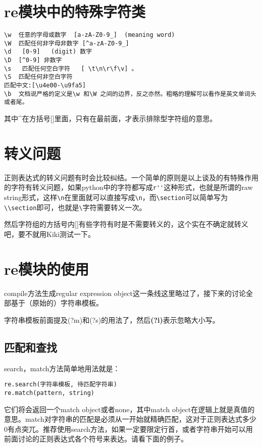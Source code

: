 \documentclass[12pt,oneside]{book}
\begin{document}
\begin{common-format}
\section{re模块中的特殊字符类}
\begin{Verbatim}
\w  任意的字母或数字  [a-zA-Z0-9_]  (meaning word)
\W  匹配任何非字母非数字 [^a-zA-Z0-9_]
\d   [0-9]   (digit) 数字
\D  [^0-9] 非数字
\s   匹配任何空白字符   [ \t\n\r\f\v] 。
\S  匹配任何非空白字符
匹配中文:[\u4e00-\u9fa5]
\b  文档说严格的定义是\w 和\W 之间的边界，反之亦然。粗略的理解可以看作是英文单词头或者尾。
\end{Verbatim}

其中\^{}在方括号[]里面，只有在最前面，才表示排除型字符组的意思。


\section{转义问题}
正则表达式的转义问题有时会比较纠结。一个简单的原则是以上谈及的有特殊作用的字符有转义问题，如果python中的字符都写成\verb+r''+这种形式，也就是所谓的raw string形式，这样\verb+\n+在里面就可以直接写成\verb+\n+，而\verb+\section+可以简单写为\verb+\\section+即可，也就是\verb+\+字符需要转义一次。

然后字符组的方括号内[]有些字符有时是不需要转义的，这个实在不确定就转义吧，要不就用Kiki测试一下。


\section{re模块的使用}
compile方法生成regular expression object这一条线这里略过了，接下来的讨论全部基于（原始的）字符串模板。

字符串模板前面提及(?m)和(?s)的用法了，然后\textbf{(?i)}表示忽略大小写。

\subsection{匹配和查找}
search，match方法简单地用法就是：
\begin{Verbatim}
re.search(字符串模板, 待匹配字符串)
re.match(pattern, string)
\end{Verbatim}

它们将会返回一个match object或者none，其中match object在逻辑上就是真值的意思。match对字符串的匹配是必须从一开始就精确匹配，这对于正则表达式多少0有点突兀。推荐使用search方法，如果一定要限定行首，或者字符串开始可以用前面讨论的正则表达式各个符号来表达。请看下面的例子。


\end{common-format}
\end{document}
